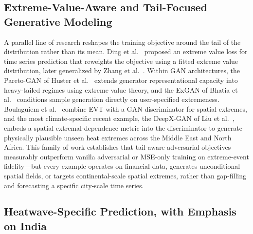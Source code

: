 \documentclass[conference]{IEEEtran}
\begin{document}
\subsection{Extreme-Value-Aware and Tail-Focused Generative Modeling}

A parallel line of research reshapes the training objective around the tail of the distribution rather
than its mean. Ding et al.~\cite{ding2019modeling} proposed an extreme value loss for time series
prediction that reweights the objective using a fitted extreme value distribution, later generalized by
Zhang et al.~\cite{zhang2021enhancing}. Within GAN architectures, the Pareto-GAN of Huster et
al.~\cite{huster2021pareto} extends generator representational capacity into heavy-tailed regimes
using extreme value theory, and the ExGAN of Bhatia et al.~\cite{bhatia2021exgan} conditions sample
generation directly on user-specified extremeness. Boulaguiem et al.~\cite{boulaguiem2022modeling}
combine EVT with a GAN discriminator for spatial extremes, and the most climate-specific recent
example, the DeepX-GAN of Liu et al.~\cite{liu2025deepxgan}, embeds a spatial extremal-dependence
metric into the discriminator to generate physically plausible unseen heat extremes across the Middle
East and North Africa. This family of work establishes that tail-aware adversarial objectives
measurably outperform vanilla adversarial or MSE-only training on extreme-event fidelity---but every
example operates on financial data, generates unconditional spatial fields, or targets
continental-scale spatial extremes, rather than gap-filling and forecasting a specific city-scale time
series.

\subsection{Heatwave-Specific Prediction, with Emphasis on India}
\end{document}
